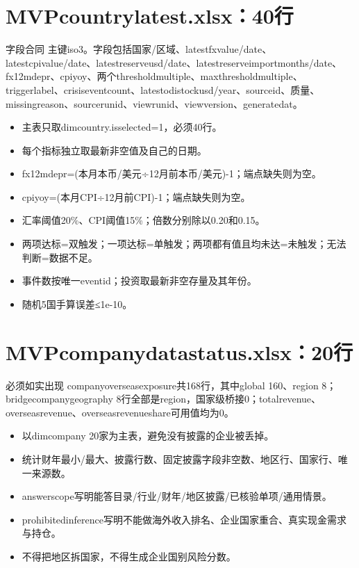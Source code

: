 \documentclass[UTF8,openany,zihao=-4]{ctexbook}
\renewcommand{\_}{\textunderscore\allowbreak}
\begin{document}
\section{MVP\_country\_latest.xlsx：40行}
\begin{statusbox}{字段合同}
主键iso3。字段包括国家/区域、latest\_fx\_value/date、latest\_cpi\_value/date、latest\_reserve\_usd/date、latest\_reserve\_import\_months/date、fx\_12m\_depr、cpi\_yoy、两个threshold\_multiple、max\_threshold\_multiple、trigger\_label、crisis\_event\_count、latest\_odi\_stock\_usd/year、source\_id、质量、missing\_reason、source\_run\_id、view\_run\_id、view\_version、generated\_at。

\end{statusbox}
\begin{itemize}
\item 主表只取dim\_country.is\_selected\_40=1，必须40行。
\item 每个指标独立取最新非空值及自己的日期。
\item fx\_12m\_depr=(本月本币/美元÷12月前本币/美元)-1；端点缺失则为空。
\item cpi\_yoy=(本月CPI÷12月前CPI)-1；端点缺失则为空。
\item 汇率阈值20\%、CPI阈值15\%；倍数分别除以0.20和0.15。
\item 两项达标=双触发；一项达标=单触发；两项都有值且均未达=未触发；无法判断=数据不足。
\item 事件数按唯一event\_id；投资取最新非空存量及其年份。
\item 随机5国手算误差≤1e-10。
\end{itemize}
\section{MVP\_company\_data\_status.xlsx：20行}
\begin{dangerbox}{必须如实出现}
company\_overseas\_exposure共168行，其中global 160、region 8；bridge\_company\_geography 8行全部是region，国家级桥接0；total\_revenue、overseas\_revenue、overseas\_revenue\_share可用值均为0。

\end{dangerbox}
\begin{itemize}
\item 以dim\_company 20家为主表，避免没有披露的企业被丢掉。
\item 统计财年最小/最大、披露行数、固定披露字段非空数、地区行、国家行、唯一来源数。
\item answer\_scope写明能答目录/行业/财年/地区披露/已核验单项/通用情景。
\item prohibited\_inference写明不能做海外收入排名、企业国家重合、真实现金需求与持仓。
\item 不得把地区拆国家，不得生成企业国别风险分数。
\end{itemize}
\end{document}
